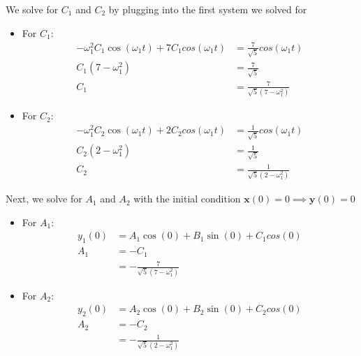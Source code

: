 \documentclass[12pt]{article}
\begin{document}
We solve for $C_1$ and $C_2$ by plugging into the first system we solved for
\begin{itemize}
    \item For $C_1$:
          \begin{align*}
              -\omega_1^2 C_1 \cos(\omega_1 t) + 7C_1cos(\omega_1t) & = \frac{7}{\sqrt{5}}cos(\omega_1t) \\
              C_1(7-\omega_1^2)                                     & = \frac{7}{\sqrt{5}}               \\
              C_1                                                   & = \frac{7}{\sqrt{5}(7-\omega_1^2)}
          \end{align*}
    \item For $C_2$:
          \begin{align*}
              -\omega_1^2 C_2 \cos(\omega_1 t) + 2C_2cos(\omega_1t) & = \frac{1}{\sqrt{5}}cos(\omega_1t) \\
              C_2(2-\omega_1^2)                                     & = \frac{1}{\sqrt{5}}               \\
              C_2                                                   & = \frac{1}{\sqrt{5}(2-\omega_1^2)}
          \end{align*}
\end{itemize}

Next, we solve for $A_1$ and $A_2$ with the initial condition $\mathbf{x}(0) = 0 \implies{} \mathbf{y}(0) = 0$
\begin{itemize}
    \item For $A_1$:
          \begin{align*}
              y_1(0) & = A_1\cos(0) + B_1\sin(0) + C_1cos(0) \\
              A_1    & = -C_1                                \\
                     & = -\frac{7}{\sqrt{5}(7-\omega_1^2)}
          \end{align*}
    \item For $A_2$:
          \begin{align*}
              y_2(0) & = A_2\cos(0) + B_2\sin(0) + C_2cos(0) \\
              A_2    & = -C_2                                \\
                     & = -\frac{1}{\sqrt{5}(2-\omega_1^2)}
          \end{align*}
\end{itemize}
\end{document}
